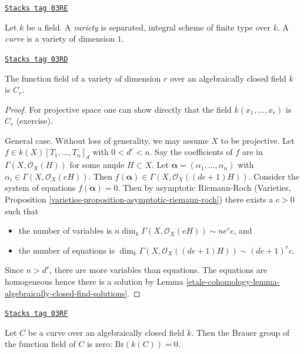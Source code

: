 \begin{definition}[Variety]
\label{etale-cohomology-definition-variety}
\href{https://stacks.math.columbia.edu/tag/03RE}{\texttt{Stacks tag 03RE}}

Let $k$ be a field. A {\it variety} is separated, integral scheme of
finite type over $k$. A {\it curve} is a variety of dimension $1$.
\end{definition}

\begin{theorem}

\label{etale-cohomology-theorem-tsen}
\href{https://stacks.math.columbia.edu/tag/03RD}{\texttt{Stacks tag 03RD}}

The function field of a variety of dimension $r$ over an algebraically closed
field $k$ is $C_r$.
\end{theorem}

\begin{proof}
For projective space one can show directly that the field
$k(x_1, \ldots, x_r)$ is $C_r$ (exercise).

\medskip\noindent
General case. Without loss of generality, we may assume $X$ to be projective.
Let $f \in k(X)[T_1, \ldots, T_n]_d$ with $0 < d^r < n$.
Say the coefficients of $f$ are in $\Gamma(X, \mathcal{O}_X(H))$
for some ample $H \subset X$. Let
$\mathbf{\alpha} = (\alpha_1, \ldots, \alpha_n)$ with $\alpha_i \in \Gamma(X,
\mathcal{O}_X(eH))$. Then $f(\mathbf{\alpha}) \in \Gamma(X,
\mathcal{O}_X((de + 1)H))$. Consider the system of equations $f(\mathbf{\alpha})
=0$. Then by asymptotic Riemann-Roch
(Varieties, Proposition \ref{varieties-proposition-asymptotic-riemann-roch})
there exists a $c > 0$ such that
\begin{itemize}
\item the number of variables is
$n\dim_k \Gamma(X, \mathcal{O}_X(eH)) \sim n e^r c$, and
\item the number of equations is
$\dim_k \Gamma(X, \mathcal{O}_X((de + 1)H)) \sim (de + 1)^r c$.
\end{itemize}
Since $n > d^r$, there are more variables than equations. The equations are
homogeneous hence there is a solution by
Lemma \ref{etale-cohomology-lemma-algebraically-closed-find-solutions}.
\end{proof}

\begin{lemma}
\label{etale-cohomology-lemma-curve-brauer-zero}
\href{https://stacks.math.columbia.edu/tag/03RF}{\texttt{Stacks tag 03RF}}

Let $C$ be a curve over an algebraically closed field $k$. Then
the Brauer group of the function field of $C$ is zero:
$\text{Br}(k(C)) = 0$.
\end{lemma}

